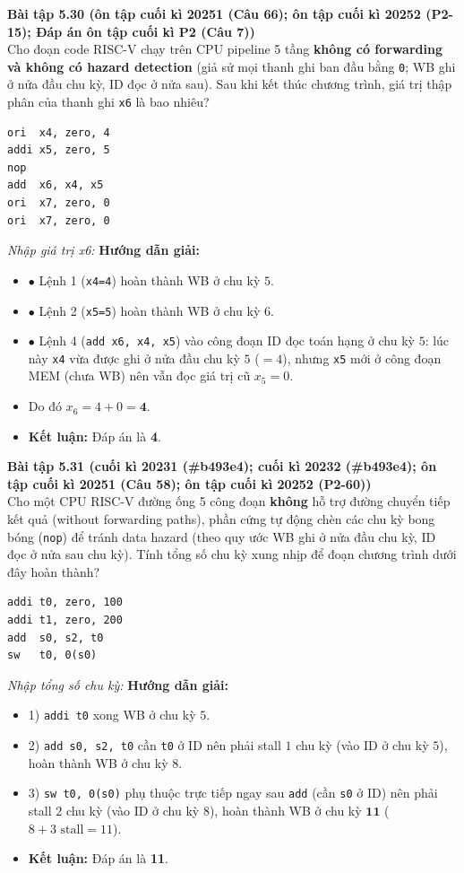 \textbf{Bài tập 5.30 (ôn tập cuối kì 20251 (Câu 66); ôn tập cuối kì 20252 (P2-15); Đáp án ôn tập cuối kì P2 (Câu 7))}\\
Cho đoạn code RISC-V chạy trên CPU pipeline 5 tầng \textbf{không có forwarding và không có hazard detection} (giả sử mọi thanh ghi ban đầu bằng \texttt{0}; WB ghi ở nửa đầu chu kỳ, ID đọc ở nửa sau). Sau khi kết thúc chương trình, giá trị thập phân của thanh ghi \texttt{x6} là bao nhiêu?
\begin{lstlisting}
ori  x4, zero, 4
addi x5, zero, 5
nop
add  x6, x4, x5
ori  x7, zero, 0
ori  x7, zero, 0
\end{lstlisting}
\textit{Nhập giá trị x6:}
\textbf{Hướng dẫn giải:}
\begin{itemize}
    \item $\bullet$ Lệnh 1 (\texttt{x4=4}) hoàn thành WB ở chu kỳ $5$.
    \item $\bullet$ Lệnh 2 (\texttt{x5=5}) hoàn thành WB ở chu kỳ $6$.
    \item $\bullet$ Lệnh 4 (\texttt{add x6, x4, x5}) vào công đoạn ID đọc toán hạng ở chu kỳ $5$: lúc này \texttt{x4} vừa được ghi ở nửa đầu chu kỳ $5$ ($= 4$), nhưng \texttt{x5} mới ở công đoạn MEM (chưa WB) nên vẫn đọc giá trị cũ $x_5 = 0$.
    \item Do đó $x_6 = 4 + 0 = \mathbf{4}$.
    \item \textbf{Kết luận:} Đáp án là \textbf{4}.
\end{itemize}

\textbf{Bài tập 5.31 (cuối kì 20231 (\#b493e4); cuối kì 20232 (\#b493e4); ôn tập cuối kì 20251 (Câu 58); ôn tập cuối kì 20252 (P2-60))}\\
Cho một CPU RISC-V đường ống 5 công đoạn \textbf{không} hỗ trợ đường chuyển tiếp kết quả (without forwarding paths), phần cứng tự động chèn các chu kỳ bong bóng (\texttt{nop}) để tránh data hazard (theo quy ước WB ghi ở nửa đầu chu kỳ, ID đọc ở nửa sau chu kỳ). Tính tổng số chu kỳ xung nhịp để đoạn chương trình dưới đây hoàn thành?
\begin{lstlisting}
addi t0, zero, 100
addi t1, zero, 200
add  s0, s2, t0
sw   t0, 0(s0)
\end{lstlisting}
\textit{Nhập tổng số chu kỳ:}
\textbf{Hướng dẫn giải:}
\begin{itemize}
    \item 1) \texttt{addi t0} xong WB ở chu kỳ $5$.
    \item 2) \texttt{add s0, s2, t0} cần \texttt{t0} ở ID nên phải stall $1$ chu kỳ (vào ID ở chu kỳ $5$), hoàn thành WB ở chu kỳ $8$.
    \item 3) \texttt{sw t0, 0(s0)} phụ thuộc trực tiếp ngay sau \texttt{add} (cần \texttt{s0} ở ID) nên phải stall $2$ chu kỳ (vào ID ở chu kỳ $8$), hoàn thành WB ở chu kỳ $\mathbf{11}$ ($8 + 3\text{ stall} = 11$).
    \item \textbf{Kết luận:} Đáp án là \textbf{11}.
\end{itemize}


